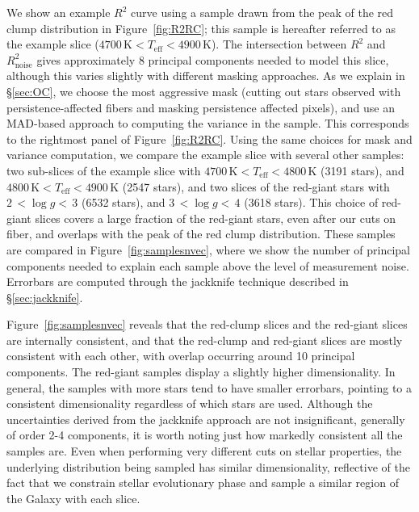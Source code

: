 \documentclass[a4paper,fleqn,usenatbib]{mnras}
\newcommand       \teff     {{T_{\mathrm{eff}}}}
\newcommand       \Rsq      {{R^2}}
\newcommand       \Rnoise   {{R^2_{\mathrm{noise}}}}
\begin{document}
We show an example $\Rsq$ curve using a sample drawn from the peak of the red clump distribution in Figure~\ref{fig:R2RC}; this sample is hereafter referred to as the example slice ($4700\,\mathrm{K} < \teff < 4900\,\mathrm{K}$).  The intersection between $\Rsq$ and $\Rnoise$ gives approximately 8 principal components needed to model this slice, although this varies slightly with different masking approaches. As we explain in \S\ref{sec:OC}, we choose the most aggressive mask (cutting out stars observed with persistence-affected fibers and masking persistence affected pixels), and use an MAD-based approach to computing the variance in the sample. This corresponds to the rightmost panel of Figure~\ref{fig:R2RC}. Using the same choices for mask and variance computation, we compare the example slice with several other samples: two sub-slices of the example slice with $4700\,\mathrm{K} < \teff < 4800\,\mathrm{K}$ (3191 stars), and $4800\,\mathrm{K} < \teff < 4900\,\mathrm{K}$ (2547 stars), and two slices of the red-giant stars with $2\, < \log g < \, 3$ (6532 stars), and $3\, < \log g < \, 4$ (3618 stars). This choice of red-giant slices covers a large fraction of the red-giant stars, even after our cuts on fiber, and overlaps with the peak of the red clump distribution. These samples are compared in Figure~\ref{fig:samplesnvec}, where we show the number of principal components needed to explain each sample above the level of measurement noise. Errorbars are computed through the jackknife technique described in \S\ref{sec:jackknife}. 

Figure~\ref{fig:samplesnvec} reveals that the red-clump slices and the red-giant slices are internally consistent, and that the red-clump and red-giant slices are mostly consistent with each other, with overlap occurring around 10 principal components. The red-giant samples display a slightly higher dimensionality. In general, the samples with more stars tend to have smaller errorbars, pointing to a consistent dimensionality regardless of which stars are used. Although the uncertainties derived from the jackknife approach are not insignificant, generally of order 2-4 components, it is worth noting just how markedly consistent all the samples are. Even when performing very different cuts on stellar properties, the underlying distribution being sampled has similar dimensionality, reflective of the fact that we constrain stellar evolutionary phase and sample a similar region of the Galaxy with each slice.
\end{document}

